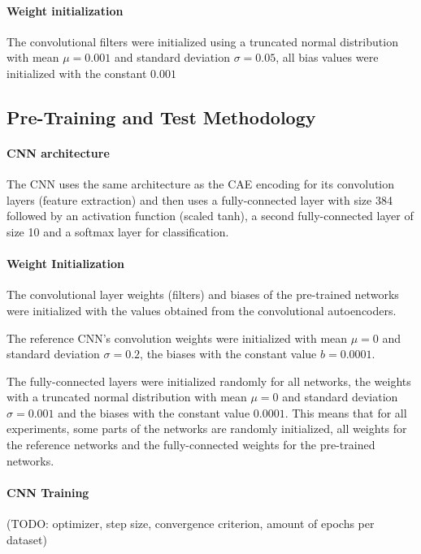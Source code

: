 \documentclass[draft]{article}
\begin{document}
    \paragraph{Weight initialization} The convolutional filters were initialized using a truncated normal distribution with mean $\mu = 0.001$ and standard deviation $\sigma = 0.05$, all bias values were initialized with the constant $0.001$

  \subsection{Pre-Training and Test Methodology}

    \paragraph{CNN architecture} The CNN uses the same architecture as the CAE encoding for its convolution layers (feature extraction) and then uses a fully-connected layer with size 384 followed by an activation function (scaled tanh), a second fully-connected layer of size 10 and a softmax layer for classification. 

    \paragraph{Weight Initialization}

    The convolutional layer weights (filters) and biases of the pre-trained networks were initialized with the values obtained from the convolutional autoencoders.

    The reference CNN's convolution weights were initialized with mean $\mu = 0 $ and standard deviation $\sigma = 0.2$, the biases with the constant value $b =  0.0001$.

    The fully-connected layers were initialized randomly for all networks, the weights with a truncated normal distribution with mean $\mu = 0$ and standard deviation $\sigma = 0.001$ and the biases with the constant value $0.0001$.
    This means that for all experiments, some parts of the networks are randomly initialized, all weights for the reference networks and the fully-connected weights for the pre-trained networks. 

    \paragraph{CNN Training}
    (TODO: optimizer, step size, convergence criterion, amount of epochs per dataset)
\end{document}
